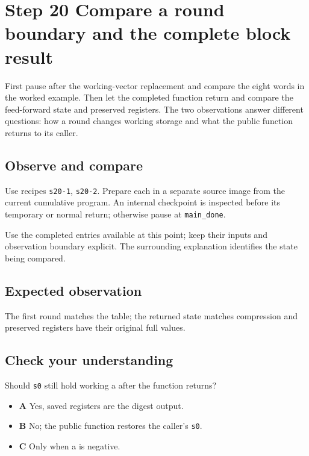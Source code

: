 \section{Step 20 Compare a round boundary and the complete block result}\label{sha-s20}

First pause after the working-vector replacement and compare the eight words in the worked example. Then let the completed function return and compare the feed-forward state and preserved registers. The two observations answer different questions: how a round changes working storage and what the public function returns to its caller.

\subsection{Observe and compare}
Use recipes \texttt{s20-1}, \texttt{s20-2}. Prepare each in a separate source image from the current cumulative program. An internal checkpoint is inspected before its temporary or normal return; otherwise pause at \texttt{main\_done}.

Use the completed entries available at this point; keep their inputs and observation boundary explicit. The surrounding explanation identifies the state being compared.

\subsection{Expected observation}
The first round matches the table; the returned state matches compression and preserved registers have their original full values.

\subsection{Check your understanding}
Should \texttt{s0} still hold working a after the function returns?

\begin{itemize}
  \item \textbf{A} Yes, saved registers are the digest output.
  \item \textbf{B} No; the public function restores the caller's \texttt{s0}.
  \item \textbf{C} Only when a is negative.
\end{itemize}
